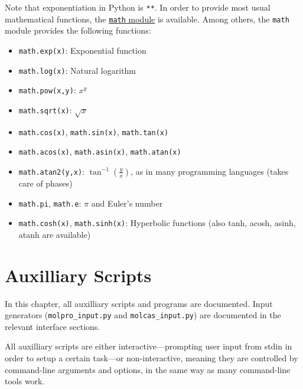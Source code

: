 \documentclass[a4paper,11pt,DIV=15,openany,twoside=false]{scrbook}
\newcommand{\ttt}[1]{\texttt{#1}}
\begin{document}
Note that exponentiation in Python is \ttt{**}. In order to provide most usual mathematical functions, the \href{https://docs.python.org/2/library/math.html}{\ttt{math} module} is available. Among others, the \ttt{math} module provides the following functions:
\begin{itemize}
  \item \ttt{math.exp(x)}: Exponential function
  \item \ttt{math.log(x)}: Natural logarithm
  \item \ttt{math.pow(x,y)}: $x^y$
  \item \ttt{math.sqrt(x)}: $\sqrt{x}$
  \item \ttt{math.cos(x)}, \ttt{math.sin(x)}, \ttt{math.tan(x)}
  \item \ttt{math.acos(x)}, \ttt{math.asin(x)}, \ttt{math.atan(x)}
  \item \ttt{math.atan2(y,x)}: $\tan^{-1}\left(\frac{y}{x}\right)$, as in many programming languages (takes care of phases)
  \item \ttt{math.pi}, \ttt{math.e}: $\pi$ and Euler's number
  \item \ttt{math.cosh(x)}, \ttt{math.sinh(x)}: Hyperbolic functions (also tanh, acosh, asinh, atanh are available)
\end{itemize}




\chapter{Auxilliary Scripts}\label{chap:aux}

In this chapter, all auxilliary scripts and programs are documented. Input generators (\ttt{molpro\_input.py} and \ttt{molcas\_input.py}) are documented in the relevant interface sections.

All auxilliary scripts are either interactive---prompting user input from stdin in order to setup a certain task---or non-interactive, meaning they are controlled by command-line arguments and options, in the same way as many command-line tools work.
\end{document}
